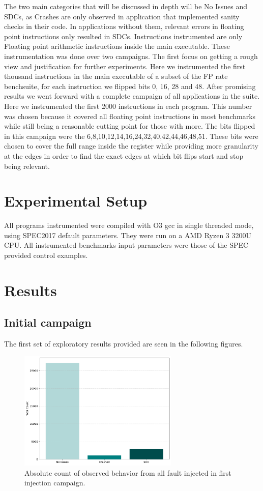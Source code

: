 \documentclass[lettersize,journal]{IEEEtran}
\begin{document}
The two main categories that will be discussed in depth will be No Issues and SDCs, as Crashes are only observed in application that implemented sanity checks in their code. In applications without them, relevant errors in floating point instructions only resulted in SDCs.
Instructions instrumented are only Floating point arithmetic instructions inside the main executable. These instrumentation was done over two campaigns. The first focus on getting a rough view and justification for further experiments. Here we instrumented the first thousand instructions in the main executable of a subset of the FP rate benchsuite, for each instruction we flipped bits 0, 16, 28 and 48. After promising results we went forward with a complete campaign of all applications in the suite. Here we instrumented the first 2000 instructions in each program. This number was chosen because it covered all floating point instructions in most benchmarks while still being a reasonable cutting point for those with more. The bits flipped in this campaign were the 6,8,10,12,14,16,24,32,40,42,44,46,48,51. These bits were chosen to cover the full range inside the register while providing more granularity at the edges in order to find the exact edges at which bit flips start and stop being relevant.
\section{Experimental Setup}
All programs instrumented were compiled with O3 gcc in single threaded mode, using SPEC2017 default parameters. They were run on a AMD Ryzen 3 3200U CPU. All instrumented benchmarks input parameters were those of the SPEC provided control examples. 

\section{Results}
\subsection{Initial campaign}
The first set of exploratory results provided are seen in the following figures.

\begin{figure}[!t]
  \centering
  \includegraphics[width=3in]{plots/general_view/general_summary.pdf}
  \caption{Absolute count of observed behavior from all fault injected in first injection campaign.}
  \label{totals}
\end{figure}
\end{document}
